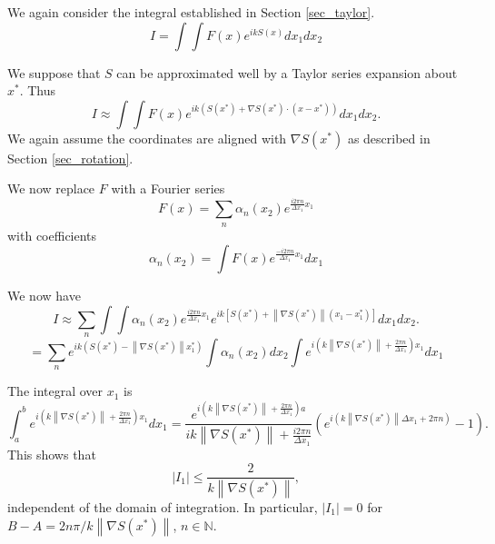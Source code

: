 \documentclass{article}
\newcommand{\norm}[1]{\left\lVert #1 \right\rVert}
\theoremstyle{plain}
\begin{document}
We again consider the integral established in Section \ref{sec_taylor}.
\begin{equation}
	I = \int\int F(x) e^{ikS(x)} dx_1dx_2
\end{equation}



We suppose that $S$ can be approximated well by a Taylor series expansion about $x^*$.
Thus
\begin{equation}
	I \approx \int\int F(x) e^{ik\left(S(x^*) + \nabla S(x^*)\cdot (x-x^*) \right)} dx_1dx_2.
\end{equation}
We again assume the coordinates are aligned with $\nabla S(x^*)$ as described in Section \ref{sec_rotation}.


We now replace $F$ with a Fourier series
\begin{equation}
	F(x) = \sum_n \alpha_n(x_2) e^{ \frac{i2\pi n}{ \Delta x_1}x_1 }
\end{equation}
with coefficients
\begin{equation}
	\alpha_n(x_2) = \int F(x) e^{ \frac{-i2\pi n}{ \Delta x_1}x_1 } dx_1
\end{equation}


We now have
\begin{equation}
	I \approx \sum_n \int\int \alpha_n(x_2) e^{ \frac{i2\pi n}{ \Delta x_1 }x_1 }
	e^{ik\left[S(x^*) + \norm{\nabla S(x^*)}(x_1-x_1^*) \right]} dx_1dx_2.
\end{equation}
\begin{equation}
	= \sum_n e^{ik \left( S(x^*) - \norm{\nabla S(x^*)}x_1^* \right)} 
	\int \alpha_n(x_2) dx_2 
	\int e^{ i\left( k\norm{\nabla S(x^*)} + \frac{2\pi n}{ \Delta x_1 }\right) x_1 } dx_1
\end{equation}



The integral over $x_1$ is
\begin{equation}
	\int_a^b e^{ i\left( k\norm{\nabla S(x^*)} + \frac{2\pi n}{ \Delta x_1 }\right) x_1 } dx_1
	= \frac{e^{ i\left( k\norm{\nabla S(x^*)} + \frac{2\pi n}{ \Delta x_1 }\right) a } }{ ik\norm{\nabla S(x^*)} + \frac{i2\pi n}{ \Delta x_1 } }
	\left( e^{ i\left( k\norm{\nabla S(x^*)}\Delta x_1 + 2\pi n \right)  } - 1 \right).
\end{equation}
This shows that
\begin{equation}
	|I_1| \leq \frac{2}{k\norm{\nabla S(x^*)}},
\end{equation}
independent of the domain of integration.
In particular, $|I_1| = 0$ for $B-A = 2n\pi / k\norm{\nabla S(x^*)}$, $n\in\mathbb{N}$.
\end{document}
